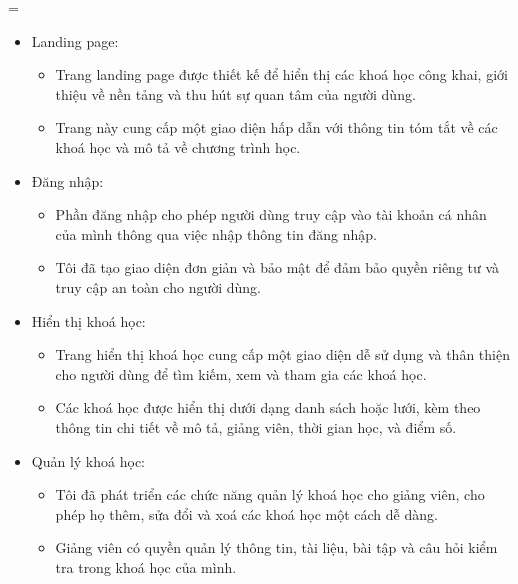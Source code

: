 =\documentclass[../Thesis.tex]{subfiles}
\begin{document}
    \begin{itemize}
        \item Landing page:
            \begin{itemize}
                \item Trang landing page được thiết kế để hiển thị các khoá học công khai, giới thiệu về nền tảng và thu hút sự quan tâm của người dùng.
                \item Trang này cung cấp một giao diện hấp dẫn với thông tin tóm tắt về các khoá học và mô tả về chương trình học.
            \end{itemize}
        \item Đăng nhập:
            \begin{itemize}
                \item Phần đăng nhập cho phép người dùng truy cập vào tài khoản cá nhân của mình thông qua việc nhập thông tin đăng nhập.
                \item Tôi đã tạo giao diện đơn giản và bảo mật để đảm bảo quyền riêng tư và truy cập an toàn cho người dùng.
            \end{itemize}
    
        \item Hiển thị khoá học:
            \begin{itemize}
    
                \item Trang hiển thị khoá học cung cấp một giao diện dễ sử dụng và thân thiện cho người dùng để tìm kiếm, xem và tham gia các khoá học.
                \item Các khoá học được hiển thị dưới dạng danh sách hoặc lưới, kèm theo thông tin chi tiết về mô tả, giảng viên, thời gian học, và điểm số.
            \end{itemize}
        \item Quản lý khoá học:
            \begin{itemize}
                \item Tôi đã phát triển các chức năng quản lý khoá học cho giảng viên, cho phép họ thêm, sửa đổi và xoá các khoá học một cách dễ dàng.
                \item Giảng viên có quyền quản lý thông tin, tài liệu, bài tập và câu hỏi kiểm tra trong khoá học của mình.
            \end{itemize}
   

\end{itemize}
\end{document}
